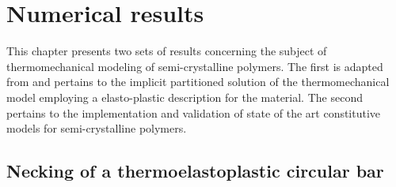 \chapter{Numerical results} \label{sec:numerical_results}

This chapter presents two sets of results concerning the subject of thermomechanical modeling of semi-crystalline polymers.
The first is adapted from \cite{vila-chaNumericalAssessmentPartitioned2023a} and pertains to the implicit partitioned solution of the thermomechanical model employing a elasto-plastic description for the material.
The second pertains to the implementation and validation of state of the art constitutive models for semi-crystalline polymers.

\section{Necking of a thermoelastoplastic circular bar}
     \label{sec:mech-driv-probl}

